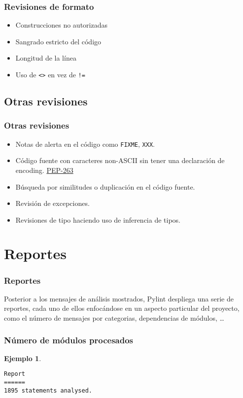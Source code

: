 \documentclass{beamer}
\newtheorem{ejemplo}{Ejemplo}
\begin{document}
\begin{frame}
    \frametitle{Revisiones de formato}

    \begin{itemize}
          \item Construcciones no autorizadas
          \item Sangrado estricto del código
          \item Longitud de la línea
          \item Uso de \texttt{<>} en vez de \texttt{!=}
    \end{itemize}
\end{frame}

\subsection{Otras revisiones}

\begin{frame}
    \frametitle{Otras revisiones}
    \begin{itemize}
          \item Notas de alerta en el código como \texttt{FIXME}, \texttt{XXX}.
          \item Código fuente con caracteres non-ASCII sin tener una declaración de encoding. \href{http://www.python.org/dev/peps/pep-0263/}{PEP-263}
          \item Búsqueda por similitudes o duplicación en el código fuente.
          \item Revisión de excepciones.
          \item Revisiones de tipo haciendo uso de inferencia de tipos.
    \end{itemize}
\end{frame}

\section{Reportes}

\begin{frame}

    \frametitle{Reportes}

    Posterior a los mensajes de análisis mostrados, Pylint despliega una serie de reportes, cada uno de ellos enfocándose en un aspecto particular del proyecto, como el número de mensajes por categorias, dependencias de módulos, \ldots
\end{frame}


\begin{frame}[fragile]
\frametitle{Número de módulos procesados}

\begin{ejemplo}
\begin{verbatim}
Report
======
1895 statements analysed.
\end{verbatim}
\end{ejemplo}

\end{frame}
\end{document}
